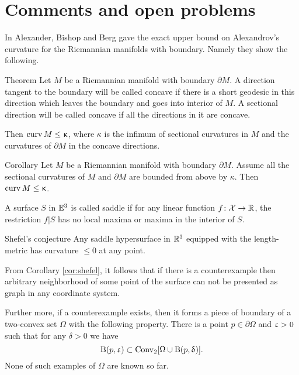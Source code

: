 \section{Comments and open problems}

In \cite{a-b-b:CBA-m-w-b} Alexander, Bishop and Berg gave the exact upper bound on Alexandrov's curvature for the Riemannian manifolds with boundary.
Namely they show the following.

\begin{thm}{Theorem}
Let $M$ be a Riemannian manifold with boundary $\partial M$.
A direction tangent to the boundary will be called concave if there is a short geodesic in this direction which leaves the boundary and goes into interior of $M$.
A sectional direction will be called concave if all the directions in it are concave.

Then $\curv M\le \kappa$, where $\kappa$ is the infimum of sectional curvatures in $M$ and  the curvatures of $\partial M$ in the concave directions.
\end{thm}

\begin{thm}{Corollary}
Let $M$ be a Riemannian manifold with boundary $\partial M$. 
Assume all the sectional curvatures of $M$ and $\partial M$ are bounded from above by $\kappa$.
Then $\curv M\le\kappa$.
\end{thm}

A surface $S$ in $\mathbb{E}^3$ is called saddle if for any linear function $f\:\spc{X}\to\RR$,
the restriction $f|S$ has no local maxima or maxima in the interior of $S$.


\begin{thm}{Shefel's conjecture}
Any saddle hypersurface in $\mathbb{R}^3$ equipped with the length-metric has curvature $\le 0$ at any point.
\end{thm} 

From Corollary \ref{cor:shefel}, it follows that if there is a counterexample then arbitrary neighborhood of some point of the surface can not be presented as graph in any coordinate system.

Further more, if a counterexample exists,
then it forms a piece of boundary of a two-convex set $\Omega$ with the following property. 
There is a point $p\in\partial \Omega$ and $\upvarepsilon>0$ 
such that for any $\delta>0$  we have
\[\oBall(p,\eps)\subset\Conv_2[\Omega\cup \oBall(p,\delta)].\]
None of such examples of $\Omega$ are known so far.

